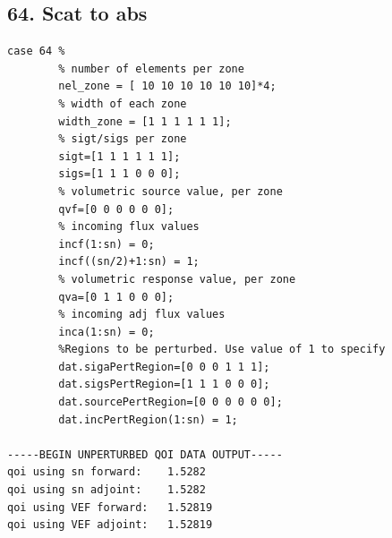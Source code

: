 \documentclass{article}
\begin{document}
\subsection{64. Scat to abs}
\begin{verbatim}
case 64 %
        % number of elements per zone
        nel_zone = [ 10 10 10 10 10 10]*4;
        % width of each zone
        width_zone = [1 1 1 1 1 1];
        % sigt/sigs per zone
        sigt=[1 1 1 1 1 1];
        sigs=[1 1 1 0 0 0];
        % volumetric source value, per zone
        qvf=[0 0 0 0 0 0];
        % incoming flux values
        incf(1:sn) = 0;
        incf((sn/2)+1:sn) = 1;
        % volumetric response value, per zone
        qva=[0 1 1 0 0 0];
        % incoming adj flux values
        inca(1:sn) = 0;
        %Regions to be perturbed. Use value of 1 to specify
        dat.sigaPertRegion=[0 0 0 1 1 1];
        dat.sigsPertRegion=[1 1 1 0 0 0];
        dat.sourcePertRegion=[0 0 0 0 0 0];
        dat.incPertRegion(1:sn) = 1; 
        
-----BEGIN UNPERTURBED QOI DATA OUTPUT----- 
qoi using sn forward: 	 1.5282 
qoi using sn adjoint: 	 1.5282 
qoi using VEF forward: 	 1.52819 
qoi using VEF adjoint: 	 1.52819 
\end{verbatim}
\end{document}
